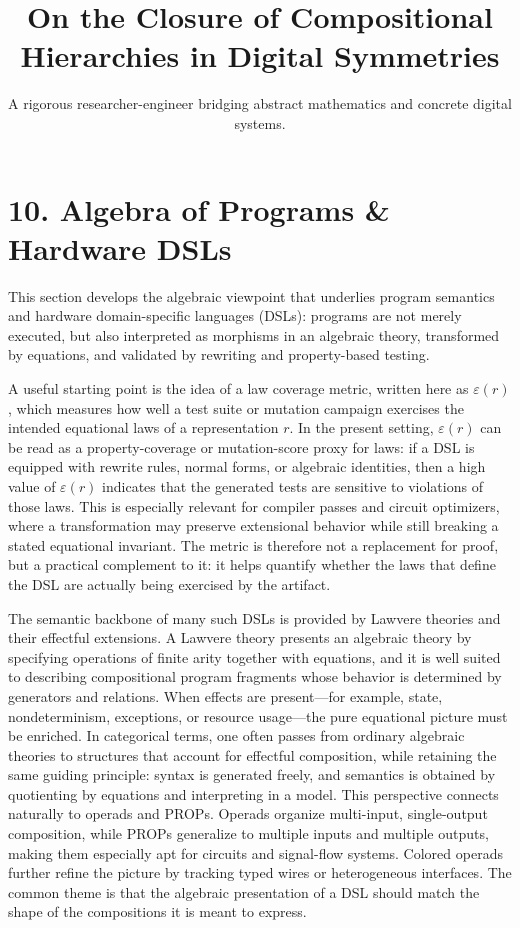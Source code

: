 \documentclass[11pt]{article}
\title{On the Closure of Compositional Hierarchies in Digital Symmetries}
\author{A rigorous researcher-engineer bridging abstract mathematics and concrete digital systems.}
\begin{document}
\section*{10. Algebra of Programs \& Hardware DSLs}

This section develops the algebraic viewpoint that underlies program semantics and hardware domain-specific languages (DSLs): programs are not merely executed, but also interpreted as morphisms in an algebraic theory, transformed by equations, and validated by rewriting and property-based testing.

A useful starting point is the idea of a law coverage metric, written here as \(\varepsilon(r)\), which measures how well a test suite or mutation campaign exercises the intended equational laws of a representation \(r\). In the present setting, \(\varepsilon(r)\) can be read as a property-coverage or mutation-score proxy for laws: if a DSL is equipped with rewrite rules, normal forms, or algebraic identities, then a high value of \(\varepsilon(r)\) indicates that the generated tests are sensitive to violations of those laws. This is especially relevant for compiler passes and circuit optimizers, where a transformation may preserve extensional behavior while still breaking a stated equational invariant. The metric is therefore not a replacement for proof, but a practical complement to it: it helps quantify whether the laws that define the DSL are actually being exercised by the artifact.

The semantic backbone of many such DSLs is provided by Lawvere theories and their effectful extensions. A Lawvere theory presents an algebraic theory by specifying operations of finite arity together with equations, and it is well suited to describing compositional program fragments whose behavior is determined by generators and relations. When effects are present---for example, state, nondeterminism, exceptions, or resource usage---the pure equational picture must be enriched. In categorical terms, one often passes from ordinary algebraic theories to structures that account for effectful composition, while retaining the same guiding principle: syntax is generated freely, and semantics is obtained by quotienting by equations and interpreting in a model. This perspective connects naturally to operads and PROPs. Operads organize multi-input, single-output composition, while PROPs generalize to multiple inputs and multiple outputs, making them especially apt for circuits and signal-flow systems. Colored operads further refine the picture by tracking typed wires or heterogeneous interfaces. The common theme is that the algebraic presentation of a DSL should match the shape of the compositions it is meant to express.
\end{document}
